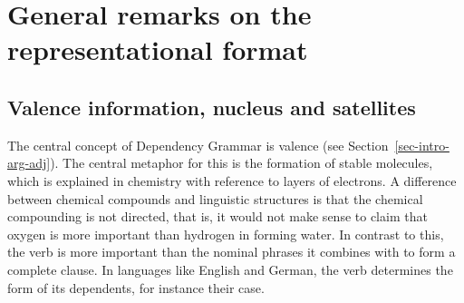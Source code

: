 












\section{General remarks on the representational format}


\subsection{Valence information, nucleus and satellites}

The central concept of Dependency Grammar is valence (see Section~\ref{sec-intro-arg-adj}). The
central metaphor for this is the formation of stable molecules, which is explained in chemistry with
reference to layers of electrons.
%
%
%
A difference between chemical compounds and linguistic structures
is that the chemical compounding is not directed, that is, it would not make sense to claim that oxygen is more
important than hydrogen in forming water. In contrast to this, the verb is more important than
the nominal phrases it combines with to form a complete clause. In languages like English and
German, the verb determines the form of its dependents, for instance their case.
 
